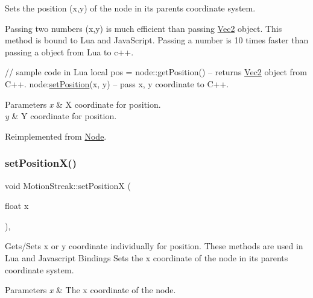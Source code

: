 Sets the position (x,y) of the node in its parent\textquotesingle{}s coordinate system.

Passing two numbers (x,y) is much efficient than passing \hyperlink{classVec2}{Vec2} object. This method is bound to Lua and Java\+Script. Passing a number is 10 times faster than passing a object from Lua to c++.


\begin{DoxyCode}
\textcolor{comment}{// sample code in Lua}
local pos  = node::getPosition()  -- returns \hyperlink{classVec2}{Vec2} \textcolor{keywordtype}{object} from C++.
node:\hyperlink{classMotionStreak_a2d7df706b1ec462093363d18fd0baf58}{setPosition}(x, y)            -- pass x, y coordinate to C++.
\end{DoxyCode}



\begin{DoxyParams}{Parameters}
{\em x} & X coordinate for position. \\
\hline
{\em y} & Y coordinate for position. \\
\hline
\end{DoxyParams}


Reimplemented from \hyperlink{classNode_aaa8545c103ef1b35e5076dbedab93af5}{Node}.

\mbox{\label{classMotionStreak_aabc8d8fedcddd0f9e1e77b090ce8f7ed}} 
\subsubsection{\texorpdfstring{set\+Position\+X()}{setPositionX()}\hspace{0.1cm}{\footnotesize\ttfamily [1/2]}}
{\footnotesize\ttfamily void Motion\+Streak\+::set\+PositionX (\begin{DoxyParamCaption}\item[{float}]{x }\end{DoxyParamCaption})\hspace{0.3cm}{\ttfamily [override]}, {\ttfamily [virtual]}}

Gets/\+Sets x or y coordinate individually for position. These methods are used in Lua and Javascript Bindings Sets the x coordinate of the node in its parent\textquotesingle{}s coordinate system.


\begin{DoxyParams}{Parameters}
{\em x} & The x coordinate of the node. \\
\hline
\end{DoxyParams}



